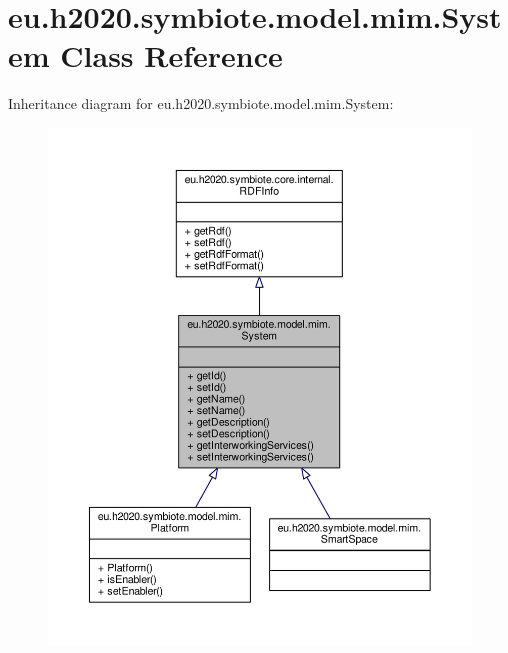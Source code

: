 \hypertarget{classeu_1_1h2020_1_1symbiote_1_1model_1_1mim_1_1System}{}\section{eu.\+h2020.\+symbiote.\+model.\+mim.\+System Class Reference}
\label{classeu_1_1h2020_1_1symbiote_1_1model_1_1mim_1_1System}


Inheritance diagram for eu.\+h2020.\+symbiote.\+model.\+mim.\+System\+:\nopagebreak
\begin{figure}[H]
\begin{center}
\leavevmode
\includegraphics[width=350pt]{classeu_1_1h2020_1_1symbiote_1_1model_1_1mim_1_1System__inherit__graph}
\end{center}
\end{figure}


